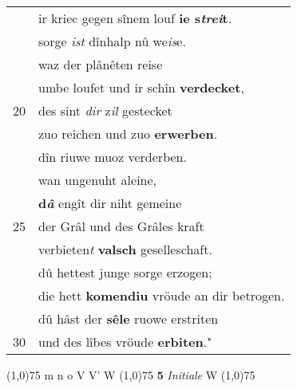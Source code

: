 \documentclass[8pt,a4paper,notitlepage]{article}
\begin{document}
\begin{table}[ht]
\begin{minipage}[t]{0.5\linewidth}
\begin{tabular}{rl}
 & ir kriec gegen sînem louf \textbf{ie s\textit{trei}t}.\\ 
 & sorge \textit{ist} dînhalp nû we\textit{is}e.\\ 
 & waz der plânêten reise\\ 
 & umbe loufet und ir schîn \textbf{verdecket},\\ 
20 & des sint \textit{dir} z\textit{il} gestecket\\ 
 & zuo reichen und zuo \textbf{erwerben}.\\ 
 & dîn riuwe muoz verderben.\\ 
 & wan ungenuht aleine,\\ 
 & \textbf{d\textit{â}} engît dir niht gemeine\\ 
25 & der Grâl und des Grâles kraft\\ 
 & verbieten\textit{t} \textbf{valsch} geselleschaft.\\ 
 & dû hettest junge sorge erzogen;\\ 
 & die hett \textbf{komendiu} vröude an dir betrogen.\\ 
 & dû hâst der \textbf{sêle} ruowe erstriten\\ 
30 & und des lîbes vröude \textbf{erbiten}."\\ 
\end{tabular}
\scriptsize
\line(1,0){75} \newline
m n o V V' W \newline
\line(1,0){75} \newline
\textbf{5} \textit{Initiale} W  \newline
\line(1,0){75} \newline

\end{minipage}
\end{table}
\end{document}
